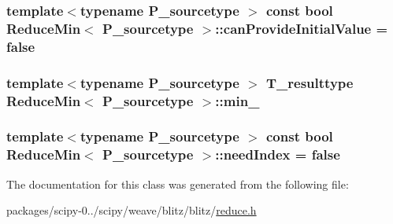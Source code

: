 \subsubsection[{can\+Provide\+Initial\+Value}]{\setlength{\rightskip}{0pt plus 5cm}template$<$typename P\+\_\+sourcetype $>$ const {\bf bool} {\bf Reduce\+Min}$<$ P\+\_\+sourcetype $>$\+::can\+Provide\+Initial\+Value = {\bf false}\hspace{0.3cm}{\ttfamily [static]}}\label{classReduceMin_aa8453c26a53a278a46172e56e347e715}
\hypertarget{classReduceMin_ab6ad6e8065cdff6f98c75c5ff2050852}{}
\subsubsection[{min\+\_\+}]{\setlength{\rightskip}{0pt plus 5cm}template$<$typename P\+\_\+sourcetype $>$ {\bf T\+\_\+resulttype} {\bf Reduce\+Min}$<$ P\+\_\+sourcetype $>$\+::min\+\_\+\hspace{0.3cm}{\ttfamily [protected]}}\label{classReduceMin_ab6ad6e8065cdff6f98c75c5ff2050852}
\hypertarget{classReduceMin_aa96204f893b09a800bf6633ce41a0ee4}{}
\subsubsection[{need\+Index}]{\setlength{\rightskip}{0pt plus 5cm}template$<$typename P\+\_\+sourcetype $>$ const {\bf bool} {\bf Reduce\+Min}$<$ P\+\_\+sourcetype $>$\+::need\+Index = {\bf false}\hspace{0.3cm}{\ttfamily [static]}}\label{classReduceMin_aa96204f893b09a800bf6633ce41a0ee4}


The documentation for this class was generated from the following file\+:\begin{DoxyCompactItemize}
\item 
packages/scipy-\/0../scipy/weave/blitz/blitz/\hyperlink{reduce_8h}{reduce.\+h}\end{DoxyCompactItemize}
